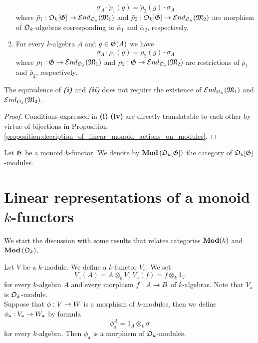 \begin{proposition}
\begin{enumerate}[label=\emph{\textbf{(\roman*)}}, leftmargin=1.5em]
$$\sigma_A \cdot \tilde{\rho}_1(g) = \tilde{\rho}_2(g) \cdot \sigma_A$$
where $\tilde{\rho}_1:{\mathfrak O}_k[{\mathfrak G}] \rightarrow {\mathcal E} nd_{{\mathfrak O}_k}({\mathfrak M}_1)$ and $\tilde{\rho}_2:{\mathfrak O}_k[{\mathfrak G}] \rightarrow {\mathcal E} nd_{{\mathfrak O}_k}({\mathfrak M}_2)$ are morphism of ${\mathfrak O}_k$-algebras corresponding to $\tilde{\alpha_1}$ and $\tilde{\alpha_2}$, respectively.
\item For every $k$-algebra $A$ and $g\in {\mathfrak G}(A)$ we have
$$\sigma_A \cdot \rho_1(g) = \rho_2(g) \cdot \sigma_A$$
where $\rho_1:{\mathfrak G} \rightarrow {\mathcal E} nd_{{\mathfrak O}_k}({\mathfrak M}_1)$ and $\rho_2:{\mathfrak G} \rightarrow {\mathcal E} nd_{{\mathfrak O}_k}({\mathfrak M}_2)$ are restrictions of $\tilde{\rho_1}$ and $\tilde{\rho_2}$, respectively.
\end{enumerate}
The equivalence of \emph{\textbf{(i)}} and \emph{\textbf{(ii)}} does not require the existence of ${\mathcal E} nd_{{\mathfrak O}_k}({\mathfrak M}_1)$ and ${\mathcal E} nd_{{\mathfrak O}_k}({\mathfrak M}_2)$.
\end{proposition}
\begin{proof}
Conditions expressed in \textbf{(i)}-\textbf{(iv)} are directly translatable to each other by virtue of bijections in Proposition \ref{proposition:decription_of_linear_monoid_actions_on_modules}. 
\end{proof}
\noindent
Let ${\mathfrak G}$ be a monoid $k$-functor. We denote by $\mathbf{Mod}\left({\mathfrak O}_k[{\mathfrak G}]\right)$ the category of ${\mathfrak O}_k[{\mathfrak G}]$-modules.

\section{Linear representations of a monoid $k$-functors}
\noindent
We start the discussion with some results that relates categories $\mathbf{Mod}(k)$ and $\mathbf{Mod}\left({\mathfrak O}_k\right)$.

\begin{example}\label{example:additive_k_functor}
Let $V$ be a $k$-module. We define a $k$-functor $V_{\mathrm{a}}$. We set
$$V_{\mathrm{a}}(A) = A\otimes_kV,\,V_{\mathrm{a}}(f) = f\otimes_k1_V$$
for every $k$-algebra $A$ and every morphism $f:A\rightarrow B$ of $k$-algebras. Note that $V_{\mathrm{a}}$ is ${\mathfrak O}_k$-module.\\
Suppose that $\phi:V\rightarrow W$ is a morphism of $k$-modules, then we define $\phi_{\mathrm{a}}:V_{\mathrm{a}}\rightarrow W_{\mathrm{a}}$ by formula
$$\phi_{\mathrm{a}}^A = 1_A\otimes_k\sigma$$
for every $k$-algebra. Then $\phi_{\mathrm{a}}$ is a morphism of ${\mathfrak O}_k$-modules.
\end{example}

